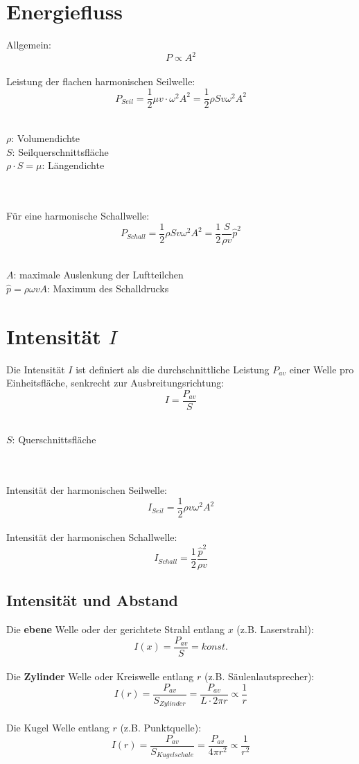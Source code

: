 \section{Energiefluss}
Allgemein:
\[
	P \propto A^2
\]
\\
Leistung der flachen harmonischen Seilwelle:
\[\boxed{
	P_{Seil} = \frac12 \mu v \cdot \omega^2 A^2 = \frac12 \rho S v \omega^2 A^2
}\]
\\
\begin{footnotesize}
	$\rho$: Volumendichte\\
	$S$: Seilquerschnittsfläche\\
	$\rho \cdot S = \mu$: Längendichte
\end{footnotesize}
\\\\
Für eine harmonische Schallwelle:
\[\boxed{
	P_{Schall} = \frac12 \rho S v \omega^2 A^2 = \frac12 \frac{S}{\rho v}\hat{p}^2
}\]
\\
\begin{footnotesize}
	$A$: maximale Auslenkung der Luftteilchen\\
	$\hat{p} = \rho\omega vA$: Maximum des Schalldrucks
\end{footnotesize}


\section{Intensität $I$}
Die Intensität $I$ ist definiert als die durchschnittliche Leistung $P_{av}$ einer Welle pro Einheitsfläche, senkrecht zur Ausbreitungsrichtung:
\[
	I = \frac{P_{av}}{S}
\]
\\
\begin{footnotesize}
	$S$: Querschnittsfläche\\
\end{footnotesize}
\\\\
Intensität der harmonischen Seilwelle:
\[\boxed{
	I_{Seil} = \frac12 \rho v \omega^2 A^2
}\]
\\
Intensität der harmonischen Schallwelle:
\[\boxed{
	I_{Schall} = \frac12 \frac{\hat{p}^2}{\rho v}
}\]



\subsection{Intensität und Abstand}
Die \textbf{ebene} Welle oder der gerichtete Strahl entlang $x$ (z.B. Laserstrahl):
\[\boxed{
	I(x) = \frac{P_{av}}{S} = konst.
}\]
\\
Die \textbf{Zylinder} Welle oder Kreiswelle entlang $r$ (z.B. Säulenlautsprecher):
\[\boxed{
	I(r) = \frac{P_{av}}{S_{Zylinder}} = \frac{P_{av}}{L\cdot 2\pi r} \propto \frac{1}{r}
}\]
\\
Die Kugel Welle entlang $r$ (z.B. Punktquelle):
\[\boxed{
	I(r) = \frac{P_{av}}{S_{Kugelschale}} = \frac{P_{av}}{4\pi r^2} \propto \frac{1}{r^2}
}\]



